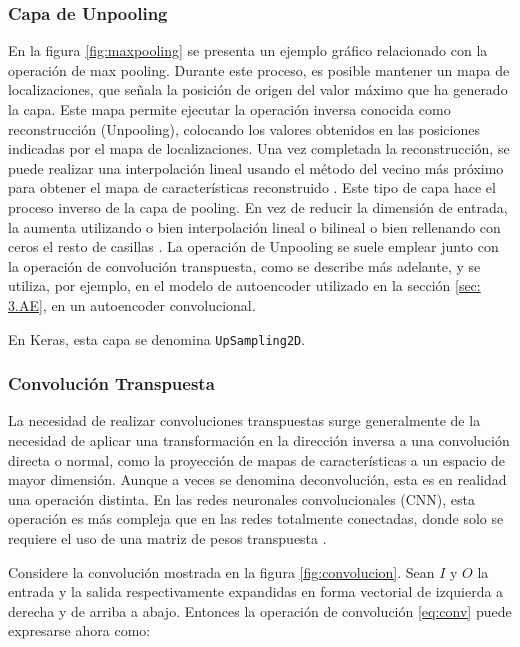 \subsubsection*{Capa de Unpooling}

En la figura \ref{fig:maxpooling} se presenta un ejemplo gráfico relacionado con la operación de max pooling. Durante este proceso, es posible mantener un mapa de localizaciones, que señala la posición de origen del valor máximo que ha generado la capa. Este mapa permite ejecutar la operación inversa conocida como reconstrucción (Unpooling), colocando los valores obtenidos en las posiciones indicadas por el mapa de localizaciones. Una vez completada la reconstrucción, se puede realizar una interpolación lineal usando el método del vecino más próximo para obtener el mapa de características reconstruido \citep{pajares2021aprendizaje}. Este tipo de capa hace el proceso inverso de la capa de pooling. En vez de reducir la dimensión de entrada, la aumenta utilizando o bien interpolación lineal o bilineal o bien rellenando con ceros el resto de casillas \citep{pajares2021aprendizaje}. La operación de Unpooling se suele emplear junto con la operación de convolución transpuesta, como se describe más adelante, y se utiliza, por ejemplo, en el modelo de autoencoder utilizado en la sección \ref{sec: 3.AE}, en un autoencoder convolucional.

En Keras, esta capa se denomina \lstinline|UpSampling2D|.


\subsubsection*{Convolución Transpuesta}

La necesidad de realizar convoluciones transpuestas surge generalmente de la necesidad de aplicar una transformación en la dirección inversa a una convolución directa o normal, como la proyección de mapas de características a un espacio de mayor dimensión. Aunque a veces se denomina deconvolución, esta es en realidad una operación distinta. En las redes neuronales convolucionales (CNN), esta operación es más compleja que en las redes totalmente conectadas, donde solo se requiere el uso de una matriz de pesos transpuesta \citep{pajares2021aprendizaje}.

Considere la convolución mostrada en la figura \ref{fig:convolucion}. Sean $I$ y $O$ la entrada y la salida respectivamente expandidas en forma vectorial de izquierda a derecha y de arriba a abajo. Entonces la operación de convolución \ref{eq:conv} puede expresarse ahora como:

